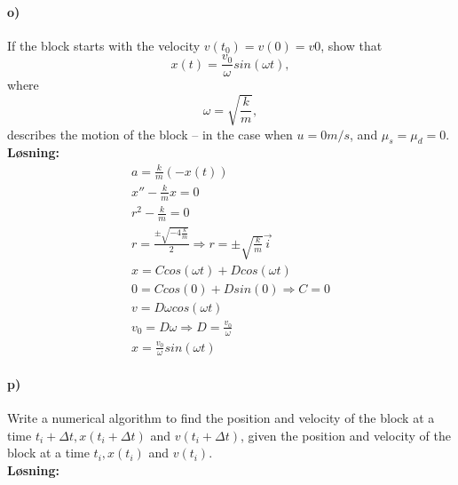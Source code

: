 \documentclass[11pt, A4paper,norsk]{article}
\begin{document}
		\paragraph{o)}
			\begin{flushleft}
If the block starts with the velocity $v(t_0) = v(0) = v0$, show that $$x(t) = \frac{v_0}{\omega}sin(\omega t),$$ where $$\omega = \sqrt{\frac{k}{m}},$$ describes the motion of the block – in the case when $u = 0m/s$, and $\mu_s = \mu_d = 0$. \\
\vspace{1mm}
\textbf{Løsning:} \\
\vspace{1mm}
				\begin{align}
a = \frac{k}{m}(-x(t)) \\
x'' - \frac{k}{m}x = 0 \\
r^2 - \frac{k}{m} = 0 \\
r = \frac{\pm \sqrt{-4 \frac{k}{m}}}{2} \Rightarrow r = \pm \sqrt{\frac{k}{m}}\vec{i} \\
x = C cos(\omega t) + D cos(\omega t) \\
0 = C cos(0) + D sin(0) \Rightarrow C = 0 \\
v = D \omega cos(\omega t) \\
v_0 = D \omega \Rightarrow D = \frac{v_0}{\omega} \\
x = \frac{v_0}{\omega}sin(\omega t)
				\end{align}
			\end{flushleft}










		\paragraph{p)}
			\begin{flushleft}
Write a numerical algorithm to find the position and velocity of the block at a time $t_i + \Delta t, x(t_i + \Delta t)$ and $v(t_i + \Delta t)$, given the position and velocity of the block at a time $t_i, x(t_i)$ and $v(t_i)$. \\
\vspace{1mm}
\textbf{Løsning:} \\
\vspace{1mm}

			\end{flushleft}
\end{document}
